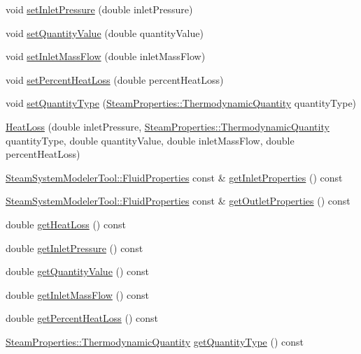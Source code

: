 \begin{DoxyCompactItemize}
void \hyperlink{class_heat_loss_ab0a6b1f2a964d161d25758318f25f7e3}{set\+Inlet\+Pressure} (double inlet\+Pressure)
\item 
void \hyperlink{class_heat_loss_ae6b6c4ac28471d7bc94e3886c48a90bd}{set\+Quantity\+Value} (double quantity\+Value)
\item 
void \hyperlink{class_heat_loss_ac4154dc9922b6ddf3f2e7a10cc64c61f}{set\+Inlet\+Mass\+Flow} (double inlet\+Mass\+Flow)
\item 
void \hyperlink{class_heat_loss_a2a4a80b16c1f975e194ae466b20d46bd}{set\+Percent\+Heat\+Loss} (double percent\+Heat\+Loss)
\item 
void \hyperlink{class_heat_loss_a7c125f1137f31eba8826a1aa3b905290}{set\+Quantity\+Type} (\hyperlink{class_steam_properties_ae0294bedf7d178c2d8fb6aed0f62fbff}{Steam\+Properties\+::\+Thermodynamic\+Quantity} quantity\+Type)
\item 
\hyperlink{class_heat_loss_a1c1bba4ef783d97e2ed63f39f625e82f}{Heat\+Loss} (double inlet\+Pressure, \hyperlink{class_steam_properties_ae0294bedf7d178c2d8fb6aed0f62fbff}{Steam\+Properties\+::\+Thermodynamic\+Quantity} quantity\+Type, double quantity\+Value, double inlet\+Mass\+Flow, double percent\+Heat\+Loss)
\item 
\hyperlink{struct_steam_system_modeler_tool_1_1_fluid_properties}{Steam\+System\+Modeler\+Tool\+::\+Fluid\+Properties} const  \& \hyperlink{class_heat_loss_a7bea461460dbacf1855d5375bbf6c097}{get\+Inlet\+Properties} () const
\item 
\hyperlink{struct_steam_system_modeler_tool_1_1_fluid_properties}{Steam\+System\+Modeler\+Tool\+::\+Fluid\+Properties} const  \& \hyperlink{class_heat_loss_a3e483dda6f393d67d7a0f28bcd75e545}{get\+Outlet\+Properties} () const
\item 
double \hyperlink{class_heat_loss_acc39533782f4f5cbf902d36f7bfc53b0}{get\+Heat\+Loss} () const
\item 
double \hyperlink{class_heat_loss_a09e6e05477fd6794ea7f42bb43da2f50}{get\+Inlet\+Pressure} () const
\item 
double \hyperlink{class_heat_loss_a7f7fd85e4fc8bf96dcc213f3dd44ecf7}{get\+Quantity\+Value} () const
\item 
double \hyperlink{class_heat_loss_ad11a428f99a4945628f66adecb88bf5a}{get\+Inlet\+Mass\+Flow} () const
\item 
double \hyperlink{class_heat_loss_acbbf01db5cde157057e4d766cab22382}{get\+Percent\+Heat\+Loss} () const
\item 
\hyperlink{class_steam_properties_ae0294bedf7d178c2d8fb6aed0f62fbff}{Steam\+Properties\+::\+Thermodynamic\+Quantity} \hyperlink{class_heat_loss_a92dc973c0fd81df192207b3df55d6c2b}{get\+Quantity\+Type} () const

\end{DoxyCompactItemize}
